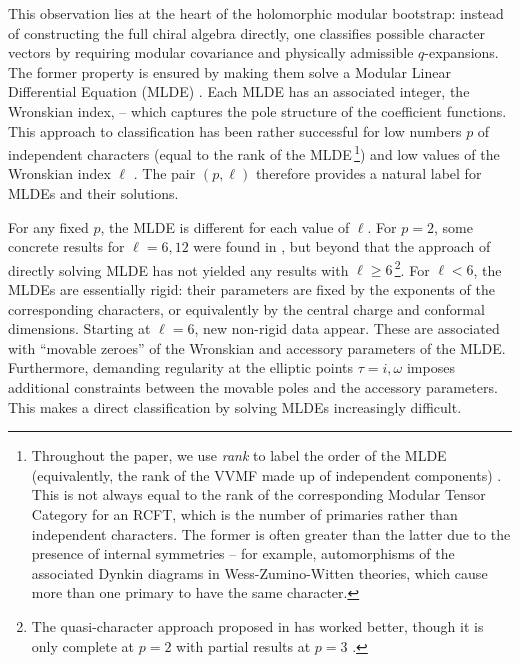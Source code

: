 \documentclass[11pt]{article}
\begin{document}
This observation lies at the heart of the holomorphic modular bootstrap: instead of constructing the full chiral algebra directly, one classifies possible character vectors by requiring modular covariance and physically admissible \(q\)-expansions. The former property is ensured by making them solve a Modular Linear Differential Equation (MLDE) \cite{Anderson:1987ge, Mathur:1988na}. Each MLDE has an associated integer, the Wronskian index, -- which captures the pole structure of the coefficient functions. This approach to classification has been rather successful for low numbers $p$ of independent characters (equal to the rank of the MLDE\,\footnote{Throughout the paper, we use {\it rank} to label the order of the MLDE (equivalently, the rank of the VVMF made up of independent components) \cite{Gannon:2013jua}. This is not always equal to the rank of the corresponding Modular Tensor Category \cite{rowell2009classification} for an RCFT, which is the number of primaries rather than independent characters. The former is often greater than the latter due to the presence of internal symmetries -- for example, automorphisms of the associated  Dynkin diagrams in Wess-Zumino-Witten theories, which cause more than one primary to have the same character.}) and low values of the Wronskian index $\ell$ \cite{Mathur:1988na, Mathur:1988gt, Mathur:1988rx, Harvey:2018rdc, Kawasetsu:2018tzs, Arike:2018fru, Chandra:2018pjq, Bae:2018qym, Mukhi:2020gnj, Grady_2020, franc2020classification, Kaidi:2020ecu, Bae:2020xzl, Kaidi:2021ent, Das:2021uvd, Bae:2021mej, Franc:2021hwo, Kaidi:2022sng, Mukhi:2022bte, Duan:2022kxr, Lee:2023owa, Pan:2023jjw, Das:2022uoe, Rayhaun:2023pgc, Govindarajan:2025rgh, Govindarajan:2025jlq, Govindarajan:2026frs}. The pair \((p,\ell)\) therefore provides a natural label for MLDEs and their solutions.

For any fixed $p$, the MLDE is different for each value of $\ell$. For $p=2$, some concrete results for $\ell=6,12$ were found in \cite{Das:2023qns}, but beyond that the approach of directly solving MLDE has not yielded any results with $\ell\ge 6$\,\footnote{The quasi-character approach proposed in \cite{Chandra:2018pjq} has worked better, though it is only complete at $p=2$ with partial results at $p=3$ \cite{Mukhi:2020gnj}.}. For \(\ell<6\), the MLDEs are essentially rigid: their parameters are fixed by the exponents of the corresponding characters, or equivalently by the central charge and conformal dimensions. Starting at \(\ell=6\), new non-rigid data appear. These are associated with ``movable zeroes'' of the Wronskian and accessory parameters of the MLDE. Furthermore, demanding regularity at the elliptic points $\tau= i, \omega$ imposes additional constraints between the movable poles and the accessory parameters. This makes a direct classification by solving MLDEs increasingly difficult.
\end{document}
